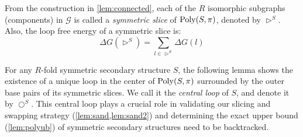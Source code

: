 \begin{Definition}\label{def:symmetric slice}
	From the construction in \cref{lem:connected}, each of the $R$ 
	isomorphic subgraphs (components) in $ \mathcal{G}$ is called a {\em symmetric slice} of $\mathrm{Poly}(S,\pi)$,  denoted  by $\rhd^{S}$. Also, the loop free energy of a symmetric slice is: 
	\begin{equation}
		\Delta G(\rhd^{S}) = \sum_{l\in \rhd^{S}} \Delta G(l)
	\end{equation}
\end{Definition}

For any $R$-fold symmetric secondary structure $S$, the following lemma shows the existence of a unique loop in the center of $\mathrm{Poly}(S,\pi)$  surrounded by the outer base pairs of its symmetric slices. We call it the {\em central loop} of $S$, and denote it by $\bigcirc^S$. This central loop plays a crucial role in validating our slicing and swapping strategy  (\cref{lem:sand,lem:sand2}) and determining the exact upper bound (\cref{lem:polyub}) of symmetric secondary structures need to be backtracked.  


